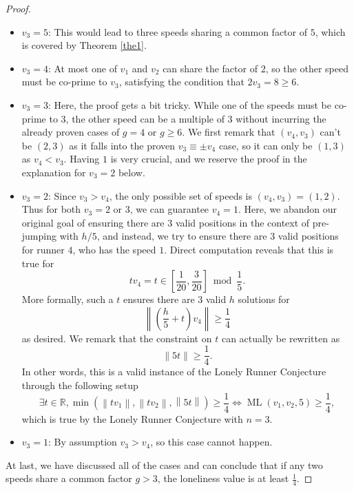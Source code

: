 \documentclass[11pt]{amsart}
\newcommand{\norm}[1]{\lVert #1 \rVert}
\newcommand{\Norm}[1]{\left\lVert #1 \right\rVert}
\DeclareMathOperator{\ML}{ML}
\begin{document}
\begin{proof}
\begin{itemize}
\begin{itemize}
            \item[--] $v_3 = 5$: This would lead to three speeds sharing a common factor of $5$, which is covered by Theorem \ref{the1}.
            \item[--] $v_3 = 4$: At most one of $v_1$ and $v_2$ can share the factor of $2$, so the other speed must be co-prime to $v_3$, satisfying the condition that $2v_3 = 8 \geq 6$.
            \item[--] $v_3 = 3$: Here, the proof gets a bit tricky. While one of the speeds must be co-prime to $3$, the other speed can be a multiple of $3$ without incurring the already proven cases of $g = 4$ or $g \geq 6$. We first remark that $(v_4,v_3)$ can't be $(2,3)$ as it falls into the proven $v_3 \equiv \pm v_4$ case, so it can only be $(1,3)$ as $v_4 < v_3$. Having $1$ is very crucial, and we reserve the proof in the explanation for $v_3 = 2$ below.
            \item[--] $v_3 = 2$: Since $v_3 > v_4$, the only possible set of speeds is $(v_4,v_3) = (1,2)$. Thus for both $v_3 = 2$ or $3$, we can guarantee $v_4 = 1$. Here, we abandon our original goal of ensuring there are $3$ valid positions in the context of pre-jumping with $h / 5$,
            and instead, we try to ensure there are $3$ valid positions for runner $4$, who has the speed $1$. Direct computation reveals that this is true for 
            $$tv_4 = t \in \left[\frac{1}{20},\frac{3}{20}\right] \bmod {\frac{1}{5}}.$$
            More formally, such a $t$ ensures there are $3$ valid $h$ solutions for
            $$\Norm{\left(\frac{h}{5} + t\right)v_4} \geq \frac{1}{4}$$
            as desired. We remark that the constraint on $t$ can actually be rewritten as
            $$\norm{5t} \geq \frac{1}{4}.$$
            In other words, this is a valid instance of the Lonely Runner Conjecture through the following setup
            $$\exists t \in \mathbb{R},   \min(\Norm{tv_1},\Norm{tv_2},\Norm{5t}) \geq \frac{1}{4} \iff \ML(v_1,v_2,5) \geq \frac{1}{4},$$
            which is true by the Lonely Runner Conjecture with $n=3$. 
            
            \item[--] $v_3 = 1$: By assumption $v_3 > v_4$, so this case cannot happen.
            
        \end{itemize}
        
    \end{itemize}
    At last, we have discussed all of the cases and can conclude that if any two speeds share a common factor $g > 3$, the loneliness value is at least $\frac{1}{4}$.
\end{proof}
\end{document}
